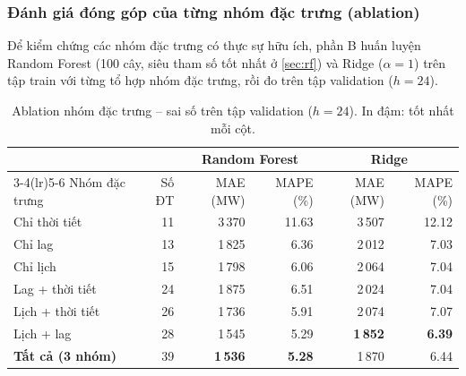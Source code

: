 \subsubsection{Đánh giá đóng góp của từng nhóm đặc trưng (ablation)}\label{sec:ablation}

Để kiểm chứng các nhóm đặc trưng có thực sự hữu ích, phần B huấn luyện Random Forest (100 cây, siêu tham số tốt
nhất ở \cref{sec:rf}) và Ridge ($\alpha=1$) trên tập train với từng tổ hợp nhóm đặc trưng, rồi đo trên tập
validation ($h=24$).

\begin{table}[H]
\centering
\caption{Ablation nhóm đặc trưng -- sai số trên tập validation ($h=24$). In đậm: tốt nhất mỗi cột.}\label{tab:ablation}
\small
\setlength{\tabcolsep}{5pt}
\begin{tabular}{lrrrrr}
\toprule
& & \multicolumn{2}{c}{Random Forest} & \multicolumn{2}{c}{Ridge}\\
\cmidrule(lr){3-4}\cmidrule(lr){5-6}
Nhóm đặc trưng & Số ĐT & MAE (MW) & MAPE (\%) & MAE (MW) & MAPE (\%)\\
\midrule
Chỉ thời tiết & 11 & 3\,370 & 11.63 & 3\,507 & 12.12\\
Chỉ lag & 13 & 1\,825 & 6.36 & 2\,012 & 7.03\\
Chỉ lịch & 15 & 1\,798 & 6.06 & 2\,064 & 7.04\\
Lag + thời tiết & 24 & 1\,875 & 6.51 & 2\,024 & 7.04\\
Lịch + thời tiết & 26 & 1\,736 & 5.91 & 2\,074 & 7.07\\
Lịch + lag & 28 & 1\,545 & 5.29 & \textbf{1\,852} & \textbf{6.39}\\
\textbf{Tất cả (3 nhóm)} & 39 & \textbf{1\,536} & \textbf{5.28} & 1\,870 & 6.44\\
\bottomrule
\end{tabular}
\end{table}

